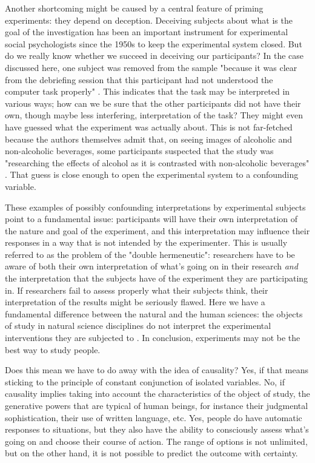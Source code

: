 \documentclass[twocolumn, serif, authordate, reflection]{jote-article}
\begin{document}
Another shortcoming might be caused by a central feature of priming experiments: they depend on deception. Deceiving subjects about what is the goal of the investigation has been an important instrument for experimental social psychologists since the 1950s to keep the experimental system closed. But do we really know whether we succeed in deceiving our participants? In the case discussed here, one subject was removed from the sample "because it was clear from the debriefing session that this participant had not understood the computer task properly"  \parencite[p. 11]{Leboeuf2020}. This indicates that the task may be interpreted in various ways; how can we be sure that the other participants did not have their own, though maybe less interfering, interpretation of the task? They might even have guessed what the experiment was actually about. This is not far-fetched because the authors themselves admit that, on seeing images of alcoholic and non-alcoholic beverages, some participants suspected that the study was "researching the effects of alcohol as it is contrasted with non-alcoholic beverages"  \parencite[p. 14]{Leboeuf2020}. That guess is close enough to open the experimental system to a confounding variable.

These examples of possibly confounding interpretations by experimental subjects point to a fundamental issue: participants will have their own interpretation of the nature and goal of the experiment, and this interpretation may influence their responses in a way that is not intended by the experimenter. This is usually referred to as the problem of the "double hermeneutic": researchers have to be aware of both their own interpretation of what’s going on in their research \textit{and }the interpretation that the subjects have of the experiment they are participating in. If researchers fail to assess properly what their subjects think, their interpretation of the results might be seriously flawed. Here we have a fundamental difference between the natural and the human sciences: the objects of study in natural science disciplines do not interpret the experimental interventions they are subjected to \parencite{Radder2019}. In conclusion, experiments may not be the best way to study people.

Does this mean we have to do away with the idea of causality? Yes, if that means sticking to the principle of constant conjunction of isolated variables. No, if causality implies taking into account the characteristics of the object of study, the generative powers that are typical of human beings, for instance their judgmental sophistication, their use of written language, etc. Yes, people do have automatic responses to situations, but they also have the ability to consciously assess what’s going on and choose their course of action. The range of options is not unlimited, but on the other hand, it is not possible to predict the outcome with certainty. 
\end{document}
